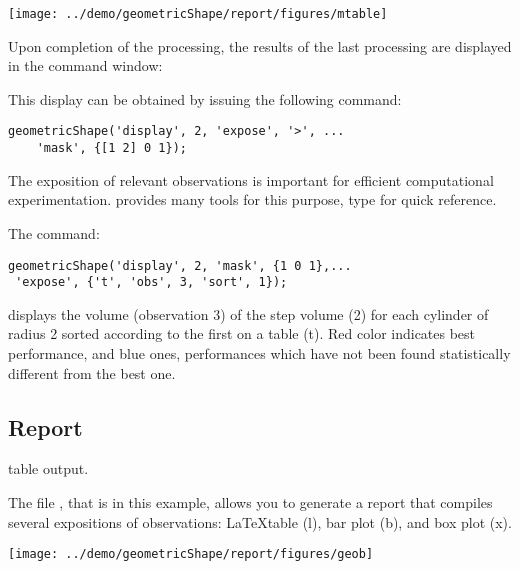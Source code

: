 \begin{marginfigure}
\texttt{[image: ../demo/geometricShape/report/figures/mtable]}
\end{marginfigure}

Upon completion of the processing, the results of the last processing are displayed in the command window:

This display can be obtained by issuing the following command:
\begin{lstlisting}
geometricShape('display', 2, 'expose', '>', ...
	'mask', {[1 2] 0 1});
\end{lstlisting}
The exposition of relevant observations is important for efficient computational experimentation. \explanes provides many tools for this purpose, type  for quick reference.


The command:
\begin{lstlisting}
geometricShape('display', 2, 'mask', {1 0 1},...
 'expose', {'t', 'obs', 3, 'sort', 1});
\end{lstlisting}

displays the volume (observation 3) of the step volume (2) for each cylinder of radius 2 sorted according to the first on a table (t). Red color indicates best performance, and blue ones, performances which have not been found statistically different from the best one.

\subsection{Report}

\begin{margintable}
\caption{\latex table output.}

\end{margintable}

The file , that is  in this example, allows you to generate a report that compiles several expositions of observations: \LaTeX table (l), bar plot (b), and box plot (x).



\begin{marginfigure}
\texttt{[image: ../demo/geometricShape/report/figures/geob]}
\end{marginfigure}


